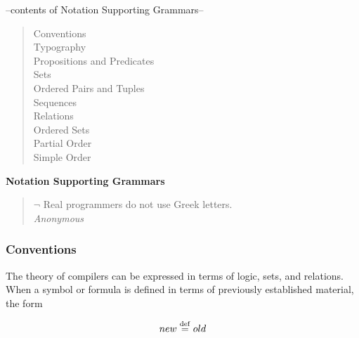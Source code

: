 




\begin{center}
  \begin{small}
    \noindent --contents of Notation Supporting Grammars--
    \begin{quote}
      \raggedright
      Conventions\\
      Typography\\
      Propositions and Predicates\\
      Sets\\
      Ordered Pairs and Tuples\\
      Sequences\\
      Relations\\
      Ordered Sets\\
      Partial Order\\
      Simple Order\\
    \end{quote}
  \end{small}
\end{center}

\vspace{1em}

\begin{center}
      {\large \bf Notation Supporting Grammars} 
\end{center}
\vspace{1em}

\setcounter{page}{1}

\begin{quote}
\raggedleft
                        $\neg$ Real programmers do not use Greek letters.\\
                        {\em Anonymous}
\end{quote}

\subsubsection{Conventions}

The theory of compilers can be expressed in terms of logic, sets, and 
relations.
When a symbol or formula is defined in terms of previously established 
material, the form

\begin{displaymath}
new \stackrel{\rm def}{=} old
\end{displaymath}

